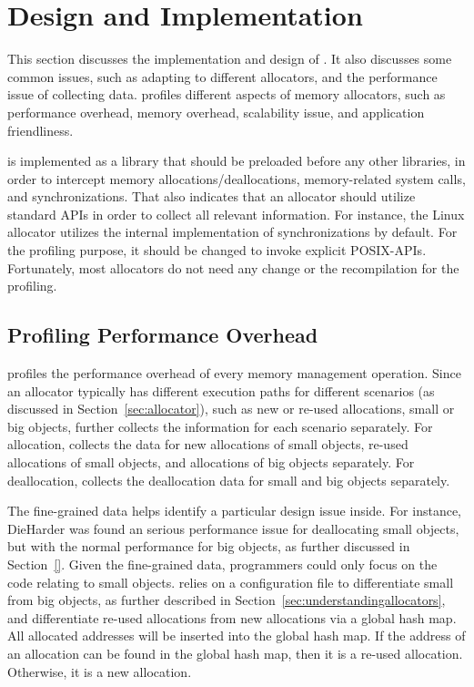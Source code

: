 \section{Design and Implementation}
\label{sec:implementation}

This section discusses the implementation and design of \MP{}. It also discusses some common issues, such as adapting to different allocators, and the performance issue of collecting data. \MP{} profiles different aspects of memory allocators, such as performance overhead, memory overhead, scalability issue, and application friendliness. 

\MP{} is implemented as a library that should be preloaded before any other libraries, in order to intercept memory allocations/deallocations, memory-related system calls, and synchronizations. That also indicates that an allocator should utilize standard APIs in order to collect all relevant information. For instance, the Linux allocator utilizes the internal implementation of synchronizations by default.  For the profiling purpose, it should be changed to invoke explicit POSIX-APIs. Fortunately, most allocators do not need any change or the recompilation for the profiling.    

\subsection{Profiling Performance Overhead}

\label{sec:performanceimplement}

\MP{} profiles the performance overhead of every memory management operation. Since an allocator typically has different execution paths for different scenarios (as discussed in Section~\ref{sec:allocator}), such as new or re-used allocations, small or big objects, \MP{} further collects the information for each scenario separately. For allocation, \MP{} collects the data for new allocations of small objects, re-used allocations of small objects, and  allocations of big objects separately. For deallocation, \MP{} collects the deallocation data for small and big objects separately. 

The fine-grained data helps identify a particular design issue inside. For instance, DieHarder was found an serious performance issue for deallocating small objects, but with the normal performance for big objects, as further discussed in Section~\ref{}. Given the fine-grained data, programmers could only focus on the code relating to small objects. \MP{} relies on a configuration file to differentiate small from big objects, as further described in Section~\ref{sec:understandingallocators}, and differentiate re-used allocations from new allocations via a global hash map. All allocated addresses will be inserted into the global hash map.  If the address of an allocation can be found in the global hash map, then it is a re-used allocation. Otherwise, it is a new allocation.  

